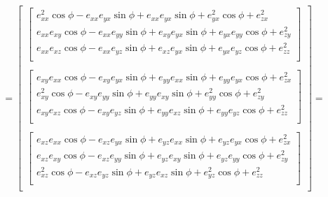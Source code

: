 \[
    =
    \begin{bmatrix}
        \begin{bmatrix}
            e_{xx}^2 \cos \phi - e_{xx} e_{yx} \sin \phi + e_{xx} e_{yx} \sin \phi + e_{yx}^2 \cos \phi + e_{zx}^2 \\
            e_{xx} e_{xy} \cos \phi - e_{xx} e_{yy} \sin \phi + e_{xy} e_{yx} \sin \phi + e_{yx} e_{yy} \cos \phi + e_{zy}^2 \\
            e_{xx} e_{xz} \cos \phi - e_{xx} e_{yz} \sin \phi + e_{xz} e_{yx} \sin \phi + e_{yx} e_{yz} \cos \phi + e_{zz}^2 \\
        \end{bmatrix} \\ \\
        \begin{bmatrix}
            e_{xy} e_{xx} \cos \phi - e_{xy} e_{yx} \sin \phi + e_{yy} e_{xx} \sin \phi + e_{yy} e_{yx} \cos \phi + e_{zx}^2 \\
            e_{xy}^2 \cos \phi - e_{xy} e_{yy} \sin \phi + e_{yy} e_{xy} \sin \phi + e_{yy}^2 \cos \phi + e_{zy}^2 \\
            e_{xy} e_{xz} \cos \phi - e_{xy} e_{yz} \sin \phi + e_{yy} e_{xz} \sin \phi + e_{yy} e_{yz} \cos \phi + e_{zz}^2 \\
        \end{bmatrix} \\ \\
        \begin{bmatrix}
            e_{xz} e_{xx} \cos \phi - e_{xz} e_{yx} \sin \phi + e_{yz} e_{xx} \sin \phi + e_{yz} e_{yx} \cos \phi + e_{zx}^2 \\
            e_{xz} e_{xy} \cos \phi - e_{xz} e_{yy} \sin \phi + e_{yz} e_{xy} \sin \phi + e_{yz} e_{yy} \cos \phi + e_{zy}^2 \\
            e_{xz}^2 \cos \phi - e_{xz} e_{yz} \sin \phi + e_{yz} e_{xz} \sin \phi + e_{yz}^2 \cos \phi + e_{zz}^2 \\
        \end{bmatrix} \\
    \end{bmatrix} =
\]
